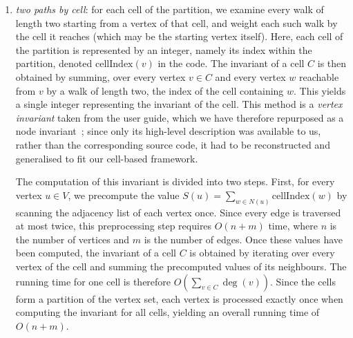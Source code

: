 \begin{enumerate}
  \item\textit{two paths by cell}: for each cell of the partition, we examine every walk of length two starting from a vertex of that cell, and weight each such walk by the cell it reaches (which may be the starting vertex itself). Here, each cell of the partition is represented by an integer, namely its index within the partition, denoted $\mathrm{cellIndex}(v)$ in the code. The invariant of a cell $C$ is then obtained by summing, over every vertex $v \in C$ and every vertex $w$ reachable from $v$ by a walk of length two, the index of the cell containing $w$. This yields a single integer representing the invariant of the cell. This method is a \textit{vertex invariant} taken from the \Naut{} user guide, which we have therefore repurposed as a node invariant~\cite{mckay2024nug}; since only its high-level description was available to us, rather than the corresponding source code, it had to be reconstructed and generalised to fit our cell-based framework.
  

\vspace{0.5em}
\noindent{}

The computation of this invariant is divided into two steps. First, for every vertex $u \in V$, we precompute the value $S(u)=\sum_{w \in N(u)} \mathrm{cellIndex}(w)$ by scanning the adjacency list of each vertex once. Since every edge is traversed at most twice, this preprocessing step requires $O(n+m)$ time, where $n$ is the number of vertices and $m$ is the number of edges. Once these values have been computed, the invariant of a cell $C$ is obtained by iterating over every vertex of the cell and summing the precomputed values of its neighbours. The running time for one cell is therefore $O\!\left(\sum_{v\in C}\deg(v)\right)$. Since the cells form a partition of the vertex set, each vertex is processed exactly once when computing the invariant for all cells, yielding an overall running time of $O(n+m)$.


\end{enumerate}
